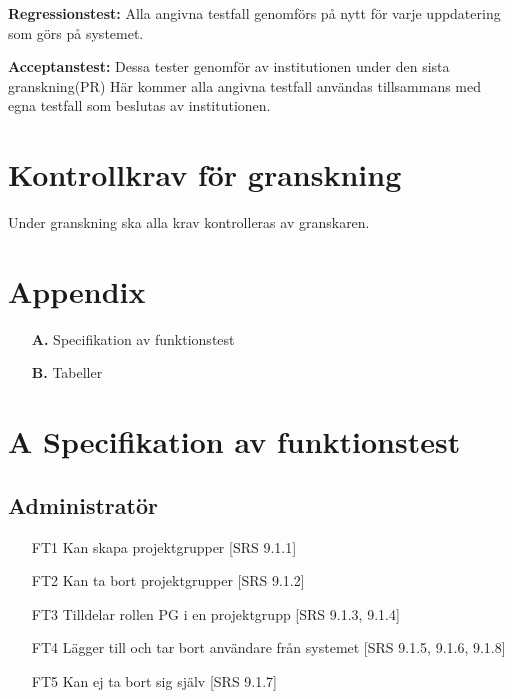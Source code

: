 \documentclass[paper=a4, fontsize=11pt,twoside]{article}
\begin{document}
{\bf Regressionstest:} Alla angivna testfall genomförs på nytt för varje
uppdatering som görs på systemet.

{\bf Acceptanstest:} Dessa tester genomför av institutionen under den sista
granskning(PR) Här kommer alla angivna testfall användas tillsammans med egna testfall som beslutas av institutionen.

 
\section{Kontrollkrav för granskning}

Under granskning ska alla krav kontrolleras av granskaren.

\section{Appendix}

\begin{itemize}
\item[\bf A.] Specifikation av funktionstest
\item[\bf B.] Tabeller
\end{itemize}

\section*{A Specifikation av funktionstest}

\subsection{Administratör}
\begin{itemize}
\item[FT1] Kan skapa projektgrupper [SRS 9.1.1] 
\item[FT2] Kan ta bort projektgrupper [SRS 9.1.2] 
\item[FT3] Tilldelar rollen PG i en projektgrupp [SRS 9.1.3, 9.1.4]
\item[FT4] Lägger till och tar bort användare från systemet [SRS 9.1.5, 9.1.6,
9.1.8]
\item[FT5] Kan ej ta bort sig själv [SRS 9.1.7]
\end{itemize}
\end{document}
